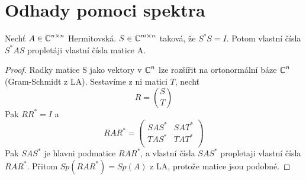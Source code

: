 \section{\texorpdfstring{Odhady pomoci spektra}{Odhady pomoci spektra}}
\vspace{5mm}
\large

\begin{theorem}[Propletani A]\label{sp_cross_a}
	Nechť $A \in \operatorname{\mathbb{C}}^{n \times n}$ Hermitovská. $S \in \operatorname{\mathbb{C}}^{m \times n}$ taková, že $S^{\ast}S = I$.
	Potom vlastní čísla $S^{\ast}AS$ propletáji vlastní čísla matice A.
\end{theorem}
\begin{proof}
	Radky matice S jako vektory v $\operatorname{\mathbb{C}}^n$ lze rozšířit na ortonormální báze $\operatorname{\mathbb{C}}^n$ (Gram-Schmidt z LA). Sestavíme z ni matici $T$, nechť
	\[ R = \binom{S}{T} \]
	Pak $RR^{\ast} = I$ a
\[
	RAR^{\ast} =
	\begin{pmatrix}
		SAS^{\ast} & SAT^{\ast} \\
		TAS^{\ast} & TAT^{\ast} \\
	\end{pmatrix}
\]
	Pak $SAS^{\ast}$ je hlavni podmatice $RAR^{\ast}$, a vlastní čísla $SAS^{\ast}$ propletaji vlastní čísla $RAR^{\ast}$.
	Přitom $Sp(RAR^{\ast}) = Sp(A)$ z LA, protože matice jsou podobné.
\end{proof}

